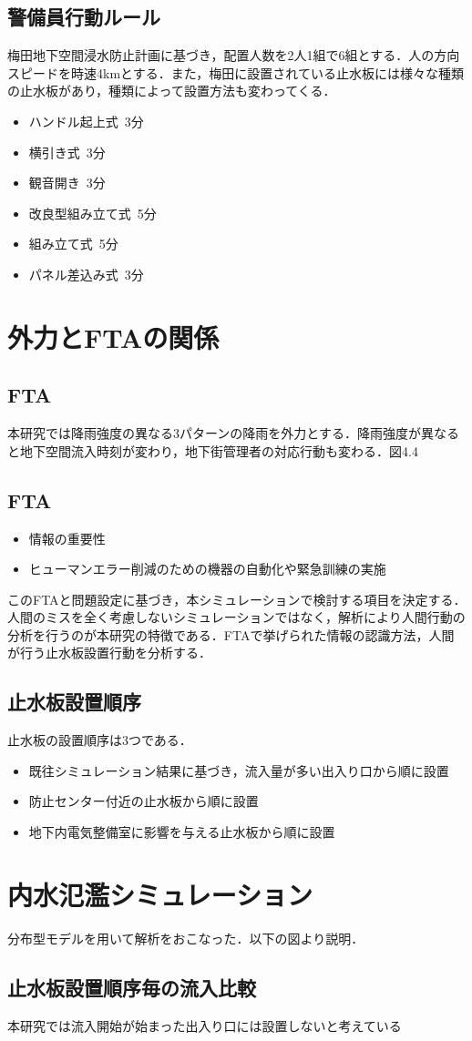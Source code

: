 \documentclass[a4j]{jarticle}
\begin{document}
\subsection{警備員行動ルール}
梅田地下空間浸水防止計画に基づき，配置人数を2人1組で6組とする．人の方向スピードを時速4kmとする．また，梅田に設置されている止水板には様々な種類の止水板があり，種類によって設置方法も変わってくる．
\begin{itemize}
\item ハンドル起上式\ 3分
\item 横引き式\ 3分
\item 観音開き\ 3分
\item 改良型組み立て式\ 5分
\item 組み立て式\ 5分
\item パネル差込み式\ 3分
  \end{itemize}
\section{外力とFTAの関係}
\subsection{FTA}
本研究では降雨強度の異なる3パターンの降雨を外力とする．降雨強度が異なると地下空間流入時刻が変わり，地下街管理者の対応行動も変わる．図4.4
\subsection{FTA}
\begin{itemize}
\item 情報の重要性
  \item ヒューマンエラー削減のための機器の自動化や緊急訓練の実施
  \end{itemize}
このFTAと問題設定に基づき，本シミュレーションで検討する項目を決定する．人間のミスを全く考慮しないシミュレーションではなく，解析により人間行動の分析を行うのが本研究の特徴である．FTAで挙げられた情報の認識方法，人間が行う止水板設置行動を分析する．
\subsection{止水板設置順序}
止水板の設置順序は3つである．
\begin{itemize}
\item 既往シミュレーション結果に基づき，流入量が多い出入り口から順に設置
\item 防止センター付近の止水板から順に設置
  \item 地下内電気整備室に影響を与える止水板から順に設置
  \end{itemize}
\section{内水氾濫シミュレーション}
分布型モデルを用いて解析をおこなった．以下の図より説明．
\subsection{止水板設置順序毎の流入比較}
本研究では流入開始が始まった出入り口には設置しないと考えている
\end{document}
